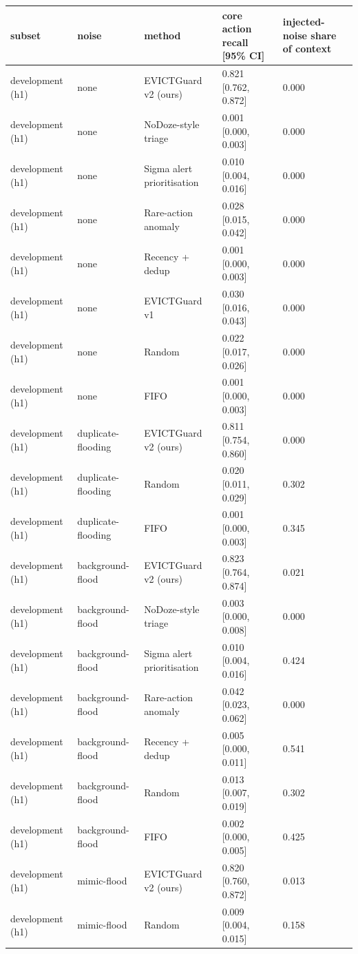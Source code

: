 \begin{tabular}{lllll}
\toprule
subset & noise & method & core action recall [95\% CI] & injected-noise share of context \\
\midrule
development (h1) & none & EVICTGuard v2 (ours) & 0.821 [0.762, 0.872] & 0.000 \\
development (h1) & none & NoDoze-style triage & 0.001 [0.000, 0.003] & 0.000 \\
development (h1) & none & Sigma alert prioritisation & 0.010 [0.004, 0.016] & 0.000 \\
development (h1) & none & Rare-action anomaly & 0.028 [0.015, 0.042] & 0.000 \\
development (h1) & none & Recency + dedup & 0.001 [0.000, 0.003] & 0.000 \\
development (h1) & none & EVICTGuard v1 & 0.030 [0.016, 0.043] & 0.000 \\
development (h1) & none & Random & 0.022 [0.017, 0.026] & 0.000 \\
development (h1) & none & FIFO & 0.001 [0.000, 0.003] & 0.000 \\
development (h1) & duplicate-flooding & EVICTGuard v2 (ours) & 0.811 [0.754, 0.860] & 0.000 \\
development (h1) & duplicate-flooding & Random & 0.020 [0.011, 0.029] & 0.302 \\
development (h1) & duplicate-flooding & FIFO & 0.001 [0.000, 0.003] & 0.345 \\
development (h1) & background-flood & EVICTGuard v2 (ours) & 0.823 [0.764, 0.874] & 0.021 \\
development (h1) & background-flood & NoDoze-style triage & 0.003 [0.000, 0.008] & 0.000 \\
development (h1) & background-flood & Sigma alert prioritisation & 0.010 [0.004, 0.016] & 0.424 \\
development (h1) & background-flood & Rare-action anomaly & 0.042 [0.023, 0.062] & 0.000 \\
development (h1) & background-flood & Recency + dedup & 0.005 [0.000, 0.011] & 0.541 \\
development (h1) & background-flood & Random & 0.013 [0.007, 0.019] & 0.302 \\
development (h1) & background-flood & FIFO & 0.002 [0.000, 0.005] & 0.425 \\
development (h1) & mimic-flood & EVICTGuard v2 (ours) & 0.820 [0.760, 0.872] & 0.013 \\
development (h1) & mimic-flood & Random & 0.009 [0.004, 0.015] & 0.158 \\

\end{tabular}
